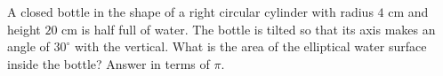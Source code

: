 A closed bottle in the shape of a right circular cylinder with radius $4$ cm and height $20$ cm is half full of water. The bottle is tilted so that its axis makes an angle of $30^\circ$ with the vertical. What is the area of the elliptical water surface inside the bottle? Answer in terms of $\pi$.
